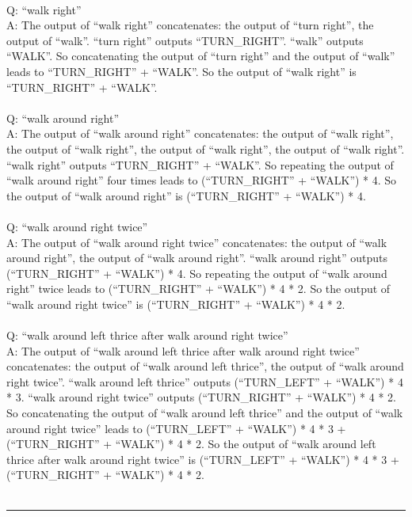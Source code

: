 {\\
Q: ``walk right'' \\
A: The output of ``walk right'' concatenates: the output of ``turn right'', the output of ``walk''. ``turn right'' outputs ``TURN\_RIGHT''. ``walk'' outputs ``WALK''. So concatenating the output of ``turn right'' and the output of ``walk'' leads to ``TURN\_RIGHT'' + ``WALK''. So the output of ``walk right'' is ``TURN\_RIGHT'' + ``WALK''. \\
\\
Q: ``walk around right'' \\
A: The output of ``walk around right'' concatenates: the output of ``walk right'', the output of ``walk right'', the output of ``walk right'', the output of ``walk right''. ``walk right'' outputs ``TURN\_RIGHT'' + ``WALK''. So repeating the output of ``walk around right'' four times leads to (``TURN\_RIGHT'' + ``WALK'') * 4. So the output of ``walk around right'' is (``TURN\_RIGHT'' + ``WALK'') * 4. \\
\\
Q: ``walk around right twice'' \\
A: The output of ``walk around right twice'' concatenates: the output of ``walk around right'', the output of ``walk around right''. ``walk around right'' outputs (``TURN\_RIGHT'' + ``WALK'') * 4. So repeating the output of ``walk around right'' twice leads to (``TURN\_RIGHT'' + ``WALK'') * 4 * 2. So the output of ``walk around right twice'' is (``TURN\_RIGHT'' + ``WALK'') * 4 * 2. \\
\\
Q: ``walk around left thrice after walk around right twice'' \\
A: The output of ``walk around left thrice after walk around right twice'' concatenates: the output of ``walk around left thrice'', the output of ``walk around right twice''. ``walk around left thrice'' outputs (``TURN\_LEFT'' + ``WALK'') * 4 * 3. ``walk around right twice'' outputs (``TURN\_RIGHT'' + ``WALK'') * 4 * 2. So concatenating the output of ``walk around left thrice'' and the output of ``walk around right twice'' leads to (``TURN\_LEFT'' + ``WALK'') * 4 * 3 + (``TURN\_RIGHT'' + ``WALK'') * 4 * 2. So the output of ``walk around left thrice after walk around right twice'' is (``TURN\_LEFT'' + ``WALK'') * 4 * 3 + (``TURN\_RIGHT'' + ``WALK'') * 4 * 2. \\
\\
\hrule \bigskip
}

